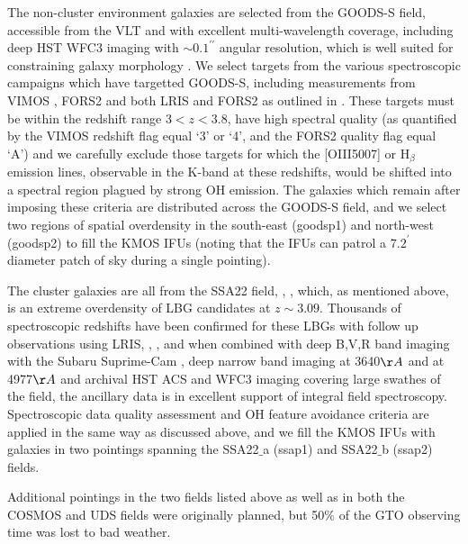 \documentclass[a4paper,fleqn,usenatbib]{mn2e}
\begin{document}
The non-cluster environment galaxies are selected from the GOODS-S field, accessible from the VLT and with excellent multi-wavelength coverage, including deep HST WFC3 imaging with $\sim 0.1^{\prime\prime}$ angular resolution, which is well suited for constraining galaxy morphology \citep{Grogin2011,Koekemoer2011}.
We select targets from the various spectroscopic campaigns which have targetted GOODS-S, including measurements from VIMOS \citep{Balestra2010,Cassata2014}, FORS2 \citep{Vanzella2005,Vanzella2006,Vanzella2008} and both LRIS and FORS2 as outlined in \cite{Wuyts2009}.
These targets must be within the redshift range $3 < z < 3.8$, have high spectral quality (as quantified by the VIMOS redshift flag equal `3' or `4', and the FORS2 quality flag equal `A') and we carefully exclude those targets for which the [OIII5007] or H$_{\beta}$ emission lines, observable in the K-band at these redshifts, would be shifted into a spectral region plagued by strong OH emission.
The galaxies which remain after imposing these criteria are distributed across the GOODS-S field, and we select two regions of spatial overdensity in the south-east (goodsp1) and north-west (goodsp2) to fill the KMOS IFUs (noting that the IFUs can patrol a $7.2^{\prime}$ diameter patch of sky during a single pointing).

The cluster galaxies are all from the SSA22 field, \citep{Steidel1998,Steidel2000,Steidel2003}, \citep{Shapley2003}, which, as mentioned above, is an extreme overdensity of LBG candidates at $z \sim 3.09$.
Thousands of spectroscopic redshifts have been confirmed for these LBGs with follow up observations using LRIS, \citep{Shapley2003}, \citep{Nestor2013}, and when combined with deep B,V,R band imaging with the Subaru Suprime-Cam \citep{Matsuda2004}, deep narrow band imaging at 3640$\AA$ \citep{Matsuda2004} and at 4977$\AA$ \citep{Nestor2011} and archival HST ACS and WFC3 imaging covering large swathes of the field, the ancillary data is in excellent support of integral field spectroscopy.
Spectroscopic data quality assessment and OH feature avoidance criteria are applied in the same way as discussed above, and we fill the KMOS IFUs with galaxies in two pointings spanning the SSA22$\_$a (ssap1) and SSA22$\_$b (ssap2) fields.


Additional pointings in the two fields listed above as well as in both the COSMOS and UDS fields were originally planned, but 50$\%$ of the GTO observing time was lost to bad weather.
\end{document}
